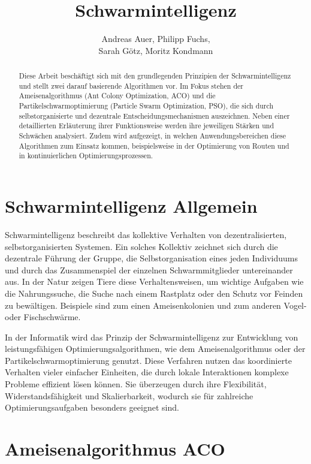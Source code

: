 \documentclass[pdftex,
               12pt,
               DIV=12,
               a4paper,
               twoside,
               parskip=half,
               abstract=true,
               dvipsnames]{scrartcl}
\author{Andreas Auer, Philipp Fuchs,\\ Sarah G\"otz, Moritz Kondmann}
\title{Schwarmintelligenz}
\begin{document}
\maketitle

\begin{abstract}
Diese Arbeit beschäftigt sich mit den grundlegenden Prinzipien der Schwarmintelligenz und stellt zwei darauf basierende Algorithmen vor. Im Fokus stehen der Ameisenalgorithmus (Ant Colony Optimization, ACO) und die Partikelschwarmoptimierung (Particle Swarm Optimization, PSO), die sich durch selbstorganisierte und dezentrale Entscheidungsmechanismen auszeichnen. Neben einer detaillierten Erläuterung ihrer Funktionsweise werden ihre jeweiligen Stärken und Schwächen analysiert. Zudem wird aufgezeigt, in welchen Anwendungsbereichen diese Algorithmen zum Einsatz kommen, beispielsweise in der Optimierung von Routen und in kontinuierlichen Optimierungsprozessen.
\end{abstract}


\section{Schwarmintelligenz Allgemein}
Schwarmintelligenz beschreibt das kollektive Verhalten von dezentralisierten, selbstorganisierten Systemen. Ein solches Kollektiv zeichnet sich durch die dezentrale F\"uhrung der Gruppe, die Selbstorganisation eines jeden Individuums und durch das Zusammenspiel der einzelnen Schwarmmitglieder untereinander aus. In der Natur zeigen Tiere diese Verhaltensweisen, um wichtige Aufgaben wie die Nahrungssuche, die Suche nach einem Rastplatz oder den Schutz vor Feinden zu bew\"altigen. Beispiele sind zum einen Ameisenkolonien und zum anderen Vogel- oder Fischschw\"arme. \cite[vgl.][]{KennedyEberhart01}

In der Informatik wird das Prinzip der Schwarmintelligenz zur Entwicklung von leistungsf\"ahigen Optimierungsalgorithmen, wie dem Ameisenalgorithmus oder der Partikelschwarmoptimierung genutzt. Diese Verfahren nutzen das koordinierte Verhalten vieler einfacher Einheiten, die durch lokale Interaktionen komplexe Probleme effizient lösen können. Sie überzeugen durch ihre Flexibilität, Widerstandsfähigkeit und Skalierbarkeit, wodurch sie für zahlreiche Optimierungsaufgaben besonders geeignet sind. \cite[vgl.][]{KennedyEberhart01, DorigoStuetzle04}


\section{Ameisenalgorithmus ACO}
\end{document}
